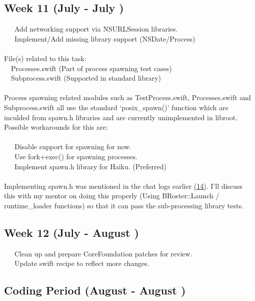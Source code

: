 \documentclass[12pt]{article}
\begin{document}
\subsection*{Week 11 (July  - July )}
\textbullet \ \ \ Add networking support via NSURLSession libraries.\\
\textbullet \ \ \ Implement/Add missing library support (NSDate/Process)\\
\\
File(s) related to this task:\\
\textbullet \ \ Processes.swift (Part of process spawning test cases) \\
\textbullet \ \ Subprocess.swift (Supported in standard library) \\
\\
Process spawning related modules such as TestProcess.swift, Processes.swift and Subprocess.swift all use the standard `posix\_spawn()' function which are inculded from spawn.h libraries and are currently unimplemented in libroot. Possible workarounds for this are: \\
\\
\textbullet \ \ \ Disable support for spawning for now. \\
\textbullet \ \ \ Use fork+exec() for spawning processes. \\
\textbullet \ \ \ Implement spawn.h library for Haiku. (Preferred)\\
\\
Implementing spawn.h was mentioned in the chat logs earlier \hyperlink{(14)}{(14)}. I'll discuss this with my mentor on doing this properly (Using BRoster::Launch / runtime\_loader functions) so that it can pass the sub-processing library tests.

\subsection*{Week 12 (July  - August )}
\textbullet \ \ \ Clean up and prepare CoreFoundation patches for review. \\
\textbullet \ \ \ Update swift recipe to reflect more changes.\\

\subsection*{ Coding Period (August  - August )}
\end{document}

